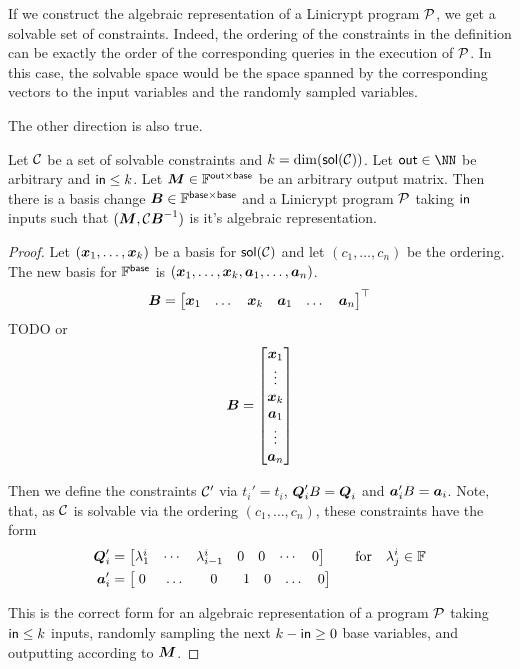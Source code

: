 If we construct the algebraic representation of a Linicrypt program $\P$,
we get a solvable set of constraints.
Indeed, the ordering of the constraints in the definition can be exactly the order of the corresponding queries in the execution of $\P$.
In this case, the solvable space would be the space spanned by the corresponding vectors to the input variables and the randomly sampled variables.

The other direction is also true.

\begin{lemma}
    Let $\C$ be a set of solvable constraints and $k = \dim (\sol (\C))$.
    Let $\out \in \NN$ be arbitrary and $\inp \leq k$.
    Let $\M \in \F^{\out \times \base}$ be an arbitrary output matrix.
    Then there is a basis change $\B \in \F^{\base \times \base}$
    and a Linicrypt program $\P$ taking $\inp$ inputs
    such that $(\M, \C \B^{-1})$ is it's algebraic representation.
\end{lemma}

\begin{proof}
Let $(\vx_1, \dots, \vx_k)$ be a basis for $\sol(\C)$ and let $(c_1, \dots, c_n)$ be the ordering.
The new basis for $\Base$ is $(\vx_1, \dots, \vx_k, \va_1, \dots, \va_n)$.
\[
    \B = 
    \begin{bmatrix}
\vx_1 &
\dots &
\vx_k &
\va_1 &
\dots &
\va_n
    \end{bmatrix}^\top
\]
TODO or
\[
    \B =
    \begin{bmatrix}
\vx_1 \\
\vdots \\
\vx_k \\
\va_1 \\
\vdots \\
\va_n
    \end{bmatrix}
\]

Then we define the constraints $\C'$ via $t_i' = t_i$, $\Q_i' B = \Q_i$ and $\va_i' B = \va_i$.
Note, that, as $\C$ is solvable via the ordering $(c_1, \dots, c_n)$,
these constraints have the form
\begin{align*}
\Q_i' &= \begin{bmatrix} \lambda^i_1 & \cdots & \lambda^i_{i-1} & 0 & 0 & \cdots & 0 \end{bmatrix} \qquad \textrm{for} \quad \lambda^i_j \in \F \\
\va_i' &= \begin{bmatrix} \;0\;\, & \dots & \;\;\;0\;\;\; & 1 & 0 & \dots & 0 \end{bmatrix}
\end{align*}

This is the correct form for an algebraic representation of a program $\P$ taking $\inp \leq k$ inputs,
randomly sampling the next $k - \inp \geq 0$ base variables,
and outputting according to $\M$.
\end{proof}

